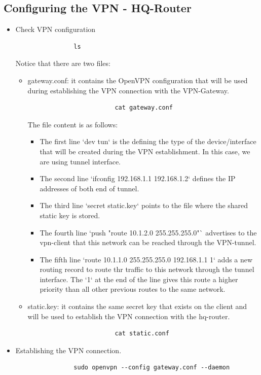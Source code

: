 \subsection{Configuring the VPN - HQ-Router}
\begin{itemize}
	\item Check VPN configuration

		\begin{verbatim}
				ls
		\end{verbatim}

		Notice that there are two files:

		\begin{itemize}
			\item gateway.conf: it contains the OpenVPN  configuration that will be used during establishing the VPN connection with the VPN-Gateway.
				\begin{verbatim}
						cat gateway.conf
				\end{verbatim}

				The file content is as follows:
					\begin{itemize}
						\item The first line `dev tun` is the defining the type of the device/interface that will be created during the VPN establishment. In this case, we are using tunnel interface.
						\item The second line `ifconfig 192.168.1.1 192.168.1.2` defines the IP addresses of both end of tunnel.
						\item The third line `secret static.key` points to the file where the shared static key is stored.
						\item The fourth line `push "route 10.1.2.0 255.255.255.0"` advertises to the vpn-client that this network can be reached through the VPN-tunnel.
						\item The fifth line `route 10.1.1.0 255.255.255.0 192.168.1.1 1` adds a new routing record to route thr traffic to this network through the tunnel interface. The `1` at the end of the line gives this route a higher priority than all other previous routes to the same network.
					\end{itemize}
			\item static.key: it contains the same secret key that exists on the client and will be used to establish the VPN connection with the hq-router.
				\begin{verbatim}
						cat static.conf
				\end{verbatim}

		\end{itemize}

	\item Establishing the VPN connection.
		\begin{verbatim}
				sudo openvpn --config gateway.conf --daemon
		\end{verbatim}
\end{itemize}

